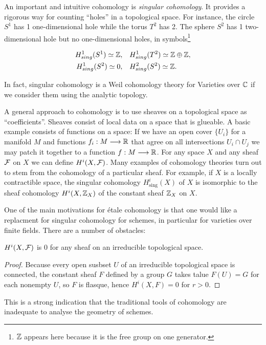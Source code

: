 An important and intuitive cohomology is \textit{singular cohomology}. It provides a rigorous way for counting ``holes'' in a topological space. For instance, the circle $S^1$ has 1 one-dimensional hole while the torus $T^2$ has 2. The sphere $S^2$ has 1 two-dimensional hole but no one-dimensional holes, in symbols\footnote{$\mathbb{Z}$ appears here because it is the free group on one generator.}

\begin{align*}
	H^1_{sing}(S^1) \simeq \mathbb{Z},\quad & H^1_{sing}(T^2) \simeq \mathbb{Z} \oplus \mathbb{Z}, \\
	H^1_{sing}(S^2) \simeq  0,\quad & H^2_{sing}(S^2) \simeq \mathbb{Z}.
\end{align*}

In fact, singular cohomology is a Weil cohomology theory for Varieties over $\mathbb{C}$ if we consider them using the analytic topology.

A general approach to cohomology is to use sheaves on a topological space as ``coefficients''. Sheaves consist of local data on a space that is glueable. A basic example consists of functions on a space: If we have an open cover $\{ U_i\}$ for a manifold $M$ and functions $f_i: M \longrightarrow \mathbb{R}$ that agree on all intersections $U_i \cap U_j$ we may patch it together to a function $f: M \longrightarrow \mathbb{R}$.
For any space $X$ and any sheaf $\mathcal{F}$ on $X$ we can define $H^i(X, \mathcal{F})$. Many examples of cohomology theories turn out to stem from the cohomology of a particular sheaf. For example, if $X$ is a locally contractible space, the singular cohomology $H_{\text{sing}}^i(X)$ of $X$ is isomorphic to the sheaf cohomology $H^i(X, \mathbb{Z}_X)$ of the constant sheaf $\mathbb{Z}_X$ on $X$.

One of the main motivations for \'etale cohomology is that one would like a replacment for singular cohomology for schemes, in particular for varieties over finite fields. There are a number of obstacles:

\begin{proposition}
	$H^i(X, \mathcal{F})$ is 0 for any sheaf on an irreducible topological space.
\end{proposition}

\begin{proof}
	Because every open susbset $U$ of an irreducible topological space is connected, the constant sheaf $F$ defined by a group $G$ takes talue $F(U) = G$ for each nonempty $U$, so $F$ is flasque, hence $H^i(X,F) = 0$ for $r>0$.
\end{proof}

This is a strong indication that the traditional tools of cohomology are inadequate to analyse the geometry of schemes.


